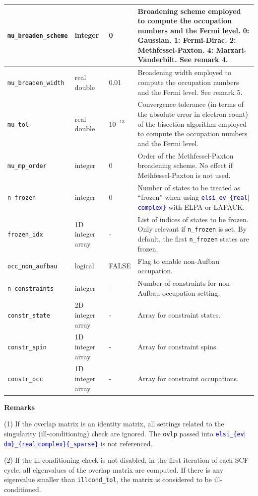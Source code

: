 \documentclass{report}
\newcommand{\api}[1]{\textcolor{blue}{\texttt{#1}}}
\begin{document}
\begin{longtable}[]{|p{30mm}|p{20mm}|p{15mm}|p{97mm}|}
\hline
\texttt{mu\_broaden\_scheme} & integer          & 0           & Broadening scheme employed to compute the occupation numbers and the Fermi level. 0: Gaussian. 1: Fermi-Dirac. 2: Methfessel-Paxton. 4: Marzari-Vanderbilt. See remark 4.\\
\hline
\texttt{mu\_broaden\_width}  & real double      & 0.01        & Broadening width employed to compute the occupation numbers and the Fermi level. See remark 5.\\
\hline
\texttt{mu\_tol}             & real double      & $10^{-13}$  & Convergence tolerance (in terms of the absolute error in electron count) of the bisection algorithm employed to compute the occupation numbers and the Fermi level.\\
\hline
\texttt{mu\_mp\_order}       & integer          & 0           & Order of the Methfessel-Paxton broadening scheme. No effect if Methfessel-Paxton is not used.\\
\hline
\texttt{n\_frozen}           & integer          & 0           & Number of states to be treated as ``frozen'' when using \api{elsi\_ev\_\{real$\vert$complex\}} with ELPA or LAPACK.\\
\hline
\texttt{frozen\_idx}         & 1D integer array & -           & List of indices of states to be frozen. Only relevant if \texttt{n\_frozen} is set. By default, the first \texttt{n\_frozen} states are frozen.\\
\hline
\texttt{occ\_non\_aufbau} & logical & FALSE  & Flag to enable non-Aufbau
occupation. \\
\hline
\texttt{n\_constraints} & integer & -  & Number of constraints for
non-Aufbau occupation setting. \\
\hline
\texttt{constr\_state} & 2D integer array & -  & Array for constraint states. \\
\hline
\texttt{constr\_spin} & 1D integer array & -  & Array for constraint spins. \\
\hline
\texttt{constr\_occ} & 1D integer array & -  & Array for constraint
occupations. \\
\hline
\end{longtable}

\textbf{Remarks}

(1) If the overlap matrix is an identity matrix, all settings related to
the singularity (ill-conditioning) check are ignored. The \texttt{ovlp}
passed into \api{elsi\_\{ev$\vert$dm\}\_\{real$\vert$complex\}\{\_sparse\}}
is not referenced.

(2) If the ill-conditioning check is not disabled, in the first iteration of each SCF cycle, all eigenvalues of the overlap matrix are computed. If there is any eigenvalue smaller than \texttt{illcond\_tol}, the matrix is considered to be ill-conditioned.
\end{document}
